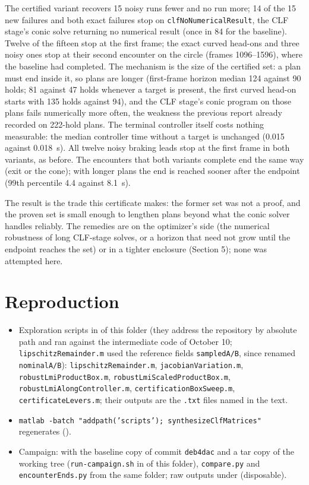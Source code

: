 \documentclass[11pt]{article}
\begin{document}
The certified variant recovers 15 noisy runs fewer and no run more; 14 of
the 15 new failures and both exact failures stop on
\texttt{clfNoNumericalResult}, the CLF stage's conic solve returning no
numerical result (once in 84 for the baseline). Twelve of the fifteen stop at
the first frame; the exact curved head-ons and three noisy ones stop at
their second encounter on the circle (frames 1096--1596), where the
baseline had completed. The mechanism is the size of the certified set: a
plan must end inside it, so plans are longer (first-frame horizon median
124 against 90 holds; 81 against 47 holds whenever a target is present,
the first curved head-on starts with 135 holds against 94), and the CLF
stage's conic program on those plans fails numerically more often, the
weakness the previous report already recorded on 222-hold plans. The
terminal controller itself costs nothing measurable: the median controller
time without a target is unchanged (0.015 against 0.018~s). All twelve noisy
braking leads stop at the first frame in both variants, as before. The
encounters that both variants complete end the same way (exit or the cone);
with longer plans the end is reached sooner after the endpoint (99th
percentile 4.4 against 8.1~s).

The result is the trade this certificate makes: the former set was not a
proof, and the proven set is small enough to lengthen plans beyond what the
conic solver handles reliably. The remedies are on the optimizer's side
(the numerical robustness of long CLF-stage solves, or a horizon that need
not grow until the endpoint reaches the set) or in a tighter enclosure
(Section 5); none was attempted here.

\section{Reproduction}
\begin{itemize}
\item Exploration scripts in  of this folder (they address the
  repository by absolute path and ran against the intermediate code of
  October 10; \texttt{lipschitzRemainder.m} used the reference fields
  \texttt{sampledA/B}, since renamed \texttt{nominalA/B}):
  \texttt{lipschitzRemainder.m}, \texttt{jacobianVariation.m},
  \texttt{robustLmiProductBox.m}, \texttt{robustLmiScaledProductBox.m},
  \texttt{robustLmiAlongController.m}, \texttt{certificationBoxSweep.m},
  \texttt{certificateLevers.m}; their
  outputs are the \texttt{.txt} files named in the text.
\item \texttt{matlab -batch "addpath('scripts'); synthesizeClfMatrices"}
  regenerates  ().
\item Campaign: 
  with the baseline copy of commit \texttt{deb4dac} and a tar copy of the
  working tree (\texttt{run-campaign.sh} in  of this folder),
  \texttt{compare.py} and \texttt{encounterEnds.py} from the same folder;
  raw outputs under 
  (disposable).
\end{itemize}
\end{document}
